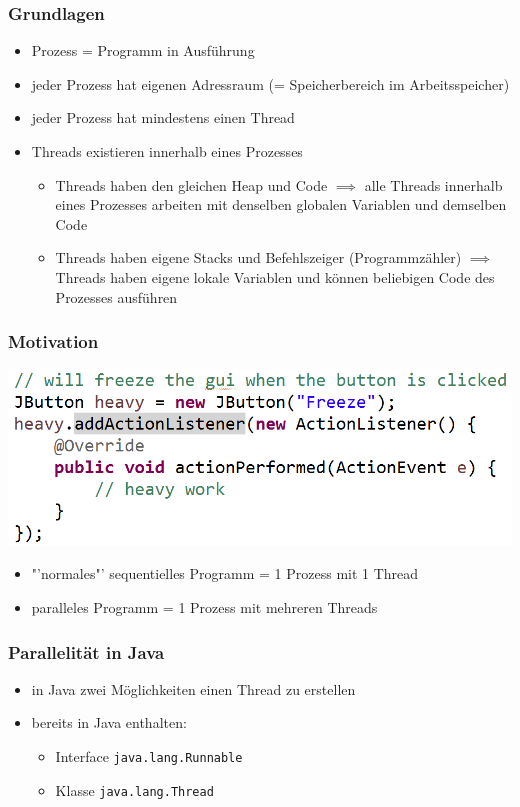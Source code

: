 \documentclass[18pt]{beamer}
\begin{document}
	\begin{frame}
		\frametitle{Grundlagen}
		\begin{itemize}
			\item Prozess = Programm in Ausführung \pause
			\item jeder Prozess hat eigenen Adressraum (= Speicherbereich im Arbeitsspeicher) \pause
			\item jeder Prozess hat mindestens einen Thread \pause
			\item Threads existieren innerhalb eines Prozesses \pause 
			\begin{itemize}
				\item Threads haben den gleichen Heap und Code \pause 
					\linebreak $\implies$ alle Threads innerhalb eines Prozesses arbeiten mit denselben globalen Variablen und demselben Code \pause 
				\item Threads haben eigene Stacks und Befehlszeiger (Programmzähler) \pause 
					\linebreak $\implies$ Threads haben eigene lokale Variablen und können beliebigen Code des Prozesses ausführen
			\end{itemize}
		\end{itemize}
	\end{frame}
	
	
	\begin{frame}
		\frametitle{Motivation}
		\includegraphics[scale=0.34]{./pics/tut5/mot-par.png}
		\pause
		\begin{itemize}
			\item "'normales"' sequentielles Programm = 1 Prozess mit 1 Thread
			\item paralleles Programm = 1 Prozess mit mehreren Threads
		\end{itemize}
	\end{frame}

	\begin{frame}
		\frametitle{Parallelität in Java}
		\begin{itemize}
			\item in Java zwei Möglichkeiten einen Thread zu erstellen
			\item bereits in Java enthalten:
			\begin{itemize}
				\item Interface \texttt{java.lang.Runnable}
				\item Klasse \texttt{java.lang.Thread}
			\end{itemize}
		\end{itemize}
	\end{frame}
\end{document}
